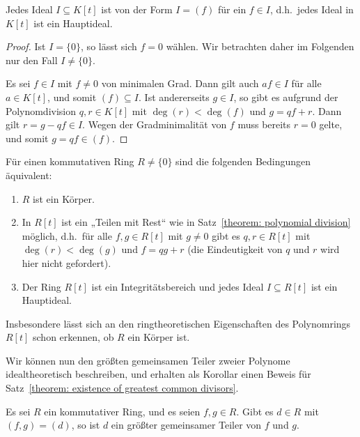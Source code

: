 \begin{proposition}
  \label{proposition: the polynomial ring is a principal ideal domain}
  Jedes Ideal $I \subseteq K[t]$ ist von der Form $I = (f)$ für ein $f \in I$, d.h.\ jedes Ideal in $K[t]$ ist ein Hauptideal.
\end{proposition}


\begin{proof}
  Ist $I = \{0\}$, so lässt sich $f = 0$ wählen.
  Wir betrachten daher im Folgenden nur den Fall $I \neq \{0\}$.
  
  Es sei $f \in I$ mit $f \neq 0$ von minimalen Grad.
  Dann gilt auch $af \in I$ für alle $a \in K[t]$, und somit $(f) \subseteq I$.
  Ist andererseits $g \in I$, so gibt es aufgrund der Polynomdivision $q, r \in K[t]$ mit $\deg(r) < \deg(f)$ und $g = q f + r$.
  Dann gilt $r = g - qf \in I$.
  Wegen der Gradminimalität von $f$ muss bereits $r = 0$ gelte, und somit $g = q f \in (f)$.
\end{proof}


\begin{remark}
  Für einen kommutativen Ring $R \neq \{0\}$ sind die folgenden Bedingungen äquivalent:
  \begin{enumerate}
    \item
      $R$ ist ein Körper.
    \item
      In $R[t]$ ist ein „Teilen mit Rest“ wie in Satz~\ref{theorem: polynomial division} möglich, d.h.\ für alle $f, g \in R[t]$ mit $g \neq 0$ gibt es $q, r \in R[t]$ mit $\deg(r) < \deg(g)$ und $f = q g + r$ (die Eindeutigkeit von $q$ und $r$ wird hier nicht gefordert).
    \item
      Der Ring $R[t]$ ist ein Integritätsbereich und jedes Ideal $I \subseteq R[t]$ ist ein Hauptideal.
  \end{enumerate}
  Insbesondere lässt sich an den ringtheoretischen Eigenschaften des Polynomrings $R[t]$ schon erkennen, ob $R$ ein Körper ist.
\end{remark}


Wir können nun den größten gemeinsamen Teiler zweier Polynome idealtheoretisch beschreiben, und erhalten als Korollar einen Beweis für Satz~\ref{theorem: existence of greatest common divisors}.


\begin{lemma}
  \label{lemma: characterization of the greatest common divisor via ideals}
  Es sei $R$ ein kommutativer Ring, und es seien $f, g \in R$.
  Gibt es $d \in R$ mit $(f, g ) = (d)$, so ist $d$ ein größter gemeinsamer Teiler von $f$ und $g$.
\end{lemma}


